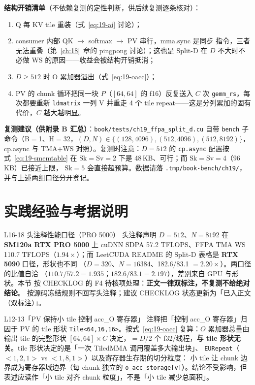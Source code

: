 \textbf{结构开销清单}（不依赖复测的定性判断，供后续复测逐条核对）：

\begin{enumerate}[itemsep=2pt,topsep=2pt]
  \item Q 每 KV tile 重装（式~\ref{eq:19-ai} 讨论）；
  \item consumer 内部 QK $\to$ softmax $\to$ PV 串行，$\mathrm{mma.sync}$ 是同步
        指令，三者无法重叠（第~\ref{ch:18}~章的 pingpong 讨论）；这也是 Split-D
        在 $D$ 不大时不必做 WS 的原因——收益会被结构开销抵消；
  \item $D \ge 512$ 时 O 累加器溢出（式~\ref{eq:19-oacc}）；
  \item PV 的 chunk 循环把同一块 $P$（$[64,64]$ 的 f16）反复送入 $C$ 次
        \texttt{gemm\_rs}，每次都要重新 \texttt{ldmatrix} 一列 V 并重走 4 个
        tile repeat——这是分列累加的固有代价，$C$ 越大越明显。
\end{enumerate}

\textbf{复测建议（供附录 B 汇总）}：\texttt{book/\allowbreak{}tests/\allowbreak{}ch19\_\allowbreak{}ffpa\_\allowbreak{}split\_\allowbreak{}d.cu} 自带
\texttt{bench} 子命令（B$=$1、H$=$32，$(D,N) \in \{(128,4096), (512,4096),
(512,8192)\}$，cp.async 与 TMA+WS 对照）。复测时注意：$D{=}512$ 的
\texttt{cp.async} 配置按式~\ref{eq:19-smemtable} 在 $\mathrm{Sk}{=}\mathrm{Sv}{=}2$
下是 48\,KB、可行；而 $\mathrm{Sk}{=}\mathrm{Sv}{=}4$（96\,KB）已接近上限，
$\mathrm{Sk}{=}5$ 会直接超预算。数据请落
\texttt{.\allowbreak{}tmp/\allowbreak{}book-bench/\allowbreak{}ch19/\allowbreak{}}，并与上述两组口径分开登记。

\section{实践经验与考据说明}

\begin{kaogu}[F4·口径差异]{L16-18 头注释性能口径（PRO 5000）}
  头注释声明 $D{=}512$、$N{=}8192$ 在 \textbf{SM120a RTX PRO 5000} 上
  cuDNN SDPA 57.2 TFLOPS、FFPA TMA WS 110.7 TFLOPS（$1.94\times$）；而 LeetCUDA
  README 的 Split-D 表格是 \textbf{RTX 5090} 口径，形状也不同
  （$D{=}320$、$N{=}16384$、182.6/83.1 $=2.20\times$）。两口径的比值自洽
  （$110.7/57.2 = 1.935$；$182.6/83.1 = 2.197$），差别来自 GPU 与形状。本节
  按 CHECKLOG 的 F4 待核项处理：\textbf{正文一律双标注，不复测不给绝对结论}。
  按源码冻结规则不回写头注释；建议 CHECKLOG 状态更新为「已入正文（双标注）」。
\end{kaogu}

\begin{kaogu}[F1/F3·表述澄清]{L12-13「PV 保持小 tile 控制 acc\_O 寄存器」}
  注释把「控制 acc\_O 寄存器」归因于 PV 的 tile 形状
  \texttt{Tile\allowbreak{}<64,\allowbreak{}16,\allowbreak{}16>}。按式~\ref{eq:19-oacc} 复算：$O$ 累加器总量由输出
  tile 的完整形状 $[64,64] \times C$ 决定，$= D/2$ 个 f32/线程，\textbf{与 tile
  形状无关}。tile 形状决定的是「一次 TiledMMA 调用覆盖多大输出块」、
  \texttt{EURepeat}（$<1,2,1>$ vs $<1,8,1>$）以及寄存器生存期的切分粒度：
  小 tile 让 chunk 边界成为寄存器域边界（每 chunk 独立的
  \texttt{o\_\allowbreak{}acc\_\allowbreak{}storage[v]}）。结论不受影响，但表述应读作「小 tile 对齐 chunk
  粒度」，不是「小 tile 减少总面积」。
\end{kaogu}

